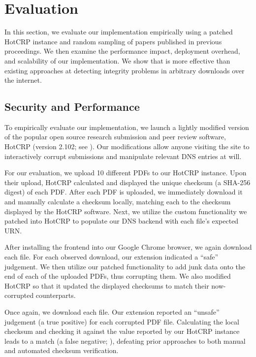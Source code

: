 \section{Evaluation} \label{sec:evaluation}

In this section, we evaluate our implementation empirically using a patched
HotCRP instance and random sampling of papers published in previous
\CONFERENCE{} proceedings. We then examine the performance impact, deployment
overhead, and scalability of our implementation. We show that \SYSTEM{} is more
effective than existing approaches at detecting integrity problems in arbitrary
downloads over the internet.

\subsection{Security and Performance}

To empirically evaluate our implementation, we launch a lightly modified version
of the popular open source research submission and peer review software, HotCRP
(version 2.102; see ). Our modifications allow anyone
visiting the site to interactively corrupt submissions and manipulate relevant
DNS entries at will.

For our evaluation, we upload 10 different \CONFERENCE{} PDFs to our HotCRP
instance. Upon their upload, HotCRP calculated and displayed the unique checksum
(a SHA-256 digest) of each PDF. After each PDF is uploaded, we immediately
download it and manually calculate a checksum locally, matching each to the
checksum displayed by the HotCRP software. Next, we utilize the custom
functionality we patched into HotCRP to populate our DNS backend with each
file's expected URN.

After installing the frontend into our Google Chrome browser, we again download
each file. For each observed download, our extension indicated a ``safe''
judgement. We then utilize our patched functionality to add junk data onto the
end of each of the uploaded PDFs, thus corrupting them. We also modified HotCRP
so that it updated the displayed checksums to match their now-corrupted
counterparts.

Once again, we download each file. Our extension reported an ``unsafe''
judgement (a true positive) for each corrupted PDF file. Calculating the local
checksum and checking it against the value reported by our HotCRP instance leads
to a match (a false negative; ), defeating prior
approaches to both manual and automated checksum verification.

